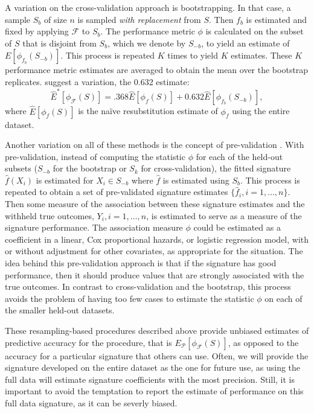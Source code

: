 \documentclass[11pt,]{article}
\begin{document}
A variation on the cross-validation approach is bootstrapping. In that
case, a sample \(S_b\) of size \(n\) is sampled \emph{with replacement}
from \(S\). Then \(f_{b}\) is estimated and fixed by applying
\(\mathcal{F}\) to \(S_{b}\). The performance metric \(\phi\) is
calculated on the subset of \(S\) that is disjoint from \(S_b\), which
we denote by \(S_{-b}\), to yield an estimate of
\(E[\phi_{f_b}(S_{-b})]\). This process is repeated \(K\) times to yield
\(K\) estimates. These \(K\) performance metric estimates are averaged
to obtain the mean over the bootstrap replicates.
\citet{efron1997improvements} suggest a variation, the 0.632 estimate:
\[
\hat{E}^*[\phi_{\mathcal{F}}(S)] = .368 \hat{E}[\phi_{f}(S)] + 0.632 \hat{E}[\phi_{f_b}(S_{-b})],
\] where \(\hat{E}[\phi_{f}(S)]\) is the naïve resubstitution estimate
of \(\phi_f\) using the entire dataset.

Another variation on all of these methods is the concept of
pre-validation \citep{tibshirani2002pre}. With pre-validation, instead
of computing the statistic \(\phi\) for each of the held-out subsets
(\(S_{-b}\) for the bootstrap or \(S_{k}\) for cross-validation), the
fitted signature \(\hat{f}(X_i)\) is estimated for \(X_i \in S_{-b}\)
where \(\hat{f}\) is estimated using \(S_{b}\). This process is repeated
to obtain a set of pre-validated signature estimates
\(\{\hat{f}_i, i = 1, \ldots, n\}\). Then some measure of the
association between these signature estimates and the withheld true
outcomes, \(Y_i, i = 1, \ldots, n\), is estimated to serve as a measure
of the signature performance. The association measure \(\phi\) could be
estimated as a coefficient in a linear, Cox proportional hazards, or
logistic regression model, with or without adjustment for other
covariates, as appropriate for the situation. The idea behind this
pre-validation approach is that if the signature has good performance,
then it should produce values that are strongly associated with the true
outcomes. In contrast to cross-validation and the bootstrap, this
process avoids the problem of having too few cases to estimate the
statistic \(\phi\) on each of the smaller held-out datasets.

These resampling-based procedures described above provide unbiased
estimates of predictive accuracy for the procedure, that is
\(E_{\mathcal{P}}[\phi_{\mathcal{F}}(S)]\), as opposed to the accuracy
for a particular signature that others can use. Often, we will provide
the signature developed on the entire dataset as the one for future use,
as using the full data will estimate signature coefficients with the
most precision. Still, it is important to avoid the temptation to report
the estimate of performance on this full data signature, as it can be
severly biased.
\end{document}
